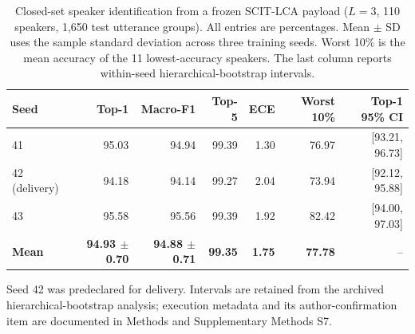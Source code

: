 \begin{table}[t]
\centering
\caption{Closed-set speaker identification from a frozen SCIT-LCA payload ($L=3$, 110 speakers, 1,650 test utterance groups). All entries are percentages. Mean $\pm$ SD uses the sample standard deviation across three training seeds. Worst 10\% is the mean accuracy of the 11 lowest-accuracy speakers. The last column reports within-seed hierarchical-bootstrap intervals.}
\label{tab:rv3-speaker}
\small\setlength{\tabcolsep}{5pt}
\begin{tabular}{lrrrrrr}
\toprule
Seed & Top-1 & Macro-F1 & Top-5 & ECE & Worst 10\% & Top-1 95\% CI\\
\midrule
41 & 95.03 & 94.94 & 99.39 & 1.30 & 76.97 & [93.21, 96.73]\\
42 (delivery) & 94.18 & 94.14 & 99.27 & 2.04 & 73.94 & [92.12, 95.88]\\
43 & 95.58 & 95.56 & 99.39 & 1.92 & 82.42 & [94.00, 97.03]\\
\textbf{Mean} & \textbf{94.93 $\pm$ 0.70} & \textbf{94.88 $\pm$ 0.71} & \textbf{99.35} & \textbf{1.75} & \textbf{77.78} & --\\
\bottomrule
\end{tabular}
\par\smallskip
\parbox{\textwidth}{\footnotesize Seed 42 was predeclared for delivery. Intervals are retained from the archived hierarchical-bootstrap analysis; execution metadata and its author-confirmation item are documented in Methods and Supplementary Methods S7.}
\end{table}
